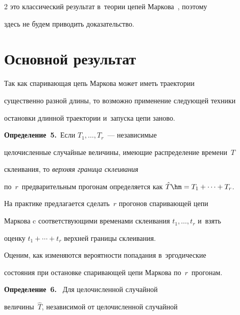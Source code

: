 \begin{multicols}{2}
это классический результат в~теории цепей Маркова~\cite{11-vin}, поэтому 

здесь не будем приводить доказательство.



\section{Основной результат}



    Так как спаривающая цепь Маркова может иметь траектории 

существенно разной длины, то возможно применение следующей техники 

остановки длинной траектории и~запуска цепи заново.

    

    \smallskip

    

    \noindent

    \textbf{Определение~5.}\ Если $T_1,\ldots ,T_r$~--- независимые 

целочисленные случайные величины, имеющие распределение времени~$T$ 

склеивания, то \textit{верхняя граница склеивания} 

по~$r$~предварительным прогонам определяется как $\hat{T}\hm= 

T_1+\cdots +T_r$.

    

    \smallskip

    

    На практике предлагается сделать~$r$ прогонов спаривающей цепи 

Маркова c соответствующими временами склеивания $t_1,\ldots , t_r$ и~взять 

оценку $t_1+\cdots +t_r$ верхней границы склеивания.

    

    Оценим, как изменяются вероятности попадания в~эргодические 

состояния при остановке спаривающей цепи Маркова по~$r$~прогонам.

    

    \smallskip

    

    \noindent

    \textbf{Определение~6.} \ Для целочисленной случайной 

величины~$\hat{T}$, независимой от целочисленной случайной 


\end{multicols}
